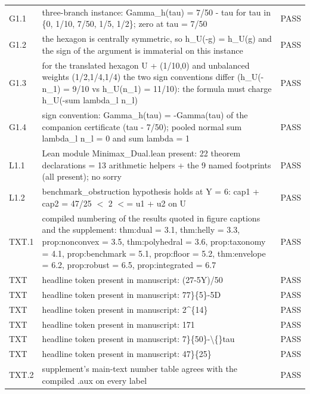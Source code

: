 \documentclass[11pt,a4paper]{article}
\theoremstyle{plain}
\theoremstyle{definition}
\theoremstyle{remark}
\begin{document}
\begin{footnotesize}
\begin{longtable}{p{1.1cm}p{12.6cm}p{0.9cm}}
G1.1 & three-branch instance: Gamma\_h(tau) = 7/50 - tau for tau in \{0, 1/10, 7/50, 1/5, 1/2\}; zero at tau = 7/50 & PASS\\
G1.2 & the hexagon is centrally symmetric, so h\_U(-g) = h\_U(g) and the sign of the argument is immaterial on this instance & PASS\\
G1.3 & for the translated hexagon U + (1/10,0) and unbalanced weights (1/2,1/4,1/4) the two sign conventions differ (h\_U(-n\_1) = 9/10 vs h\_U(n\_1) = 11/10): the formula must charge h\_U(-sum lambda\_l n\_l) & PASS\\
G1.4 & sign convention: Gamma\_h(tau) = -Gamma(tau) of the companion certificate (tau - 7/50); pooled normal sum lambda\_l n\_l = 0 and sum lambda = 1 & PASS\\
L1.1 & Lean module Minimax\_Dual.lean present: 22 theorem declarations = 13 arithmetic helpers + the 9 named footprints (all present); no sorry & PASS\\
L1.2 & benchmark\_obstruction hypothesis holds at Y = 6: cap1 + cap2 = 47/25 $<$ 2 $<$= u1 + u2 on U & PASS\\
TXT.1 & compiled numbering of the results quoted in figure captions and the supplement: thm:dual = 3.1, thm:helly = 3.3, prop:nonconvex = 3.5, thm:polyhedral = 3.6, prop:taxonomy = 4.1, prop:benchmark = 5.1, prop:floor = 5.2, thm:envelope = 6.2, prop:robust = 6.5, prop:integrated = 6.7 & PASS\\
TXT & headline token present in manuscript: (27-5Y)/50 & PASS\\
TXT & headline token present in manuscript: 77\}\{5\}-5D & PASS\\
TXT & headline token present in manuscript: 2\^{}\{14\} & PASS\\
TXT & headline token present in manuscript: 171 & PASS\\
TXT & headline token present in manuscript: 7\}\{50\}-\textbackslash\{\}tau & PASS\\
TXT & headline token present in manuscript: 47\}\{25\} & PASS\\
TXT.2 & supplement's main-text number table agrees with the compiled .aux on every label & PASS\\
\end{longtable}
\end{footnotesize}
\end{document}
